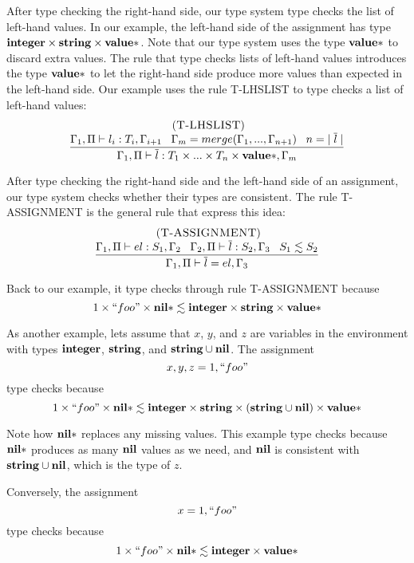 After type checking the right-hand side, our type system type checks the list
of left-hand values.
In our example, the left-hand side of the assignment has type 
$\mathbf{integer} \times \mathbf{string} \times \mathbf{value}{*}$.
Note that our type system uses the type $\mathbf{value}{*}$ to discard extra values.
The rule that type checks lists of left-hand values introduces the type
$\mathbf{value}{*}$ to let the right-hand side produce more values than
expected in the left-hand side.
Our example uses the rule \textsc{T-LHSLIST} to type
checks a list of left-hand values:
\[
\begin{array}{c}
\; (\textsc{T-LHSLIST})\\
\dfrac{\Gamma_{1}, \Pi \vdash l_{i}:T_{i}, \Gamma_{i+1} \;\;\;
       \Gamma_{m} = merge(\Gamma_{1}, ..., \Gamma_{n+1}) \;\;\;
       n = |\;\overline{l}\;|}
      {\Gamma_{1}, \Pi \vdash \overline{l}:T_{1} \times ... \times T_{n} \times \mathbf{value}{*}, \Gamma_{m}}
\end{array}
\]

After type checking the right-hand side and the left-hand side of an assignment,
our type system checks whether their types are consistent.
The rule \textsc{T-ASSIGNMENT} is the general rule that express this idea:
\[
\begin{array}{c}
\; (\textsc{T-ASSIGNMENT})\\
\dfrac{\Gamma_{1}, \Pi \vdash el:S_{1}, \Gamma_{2} \;\;\;
       \Gamma_{2}, \Pi \vdash \overline{l}:S_{2}, \Gamma_{3} \;\;\;
       S_{1} \lesssim S_{2}}
      {\Gamma_{1}, \Pi \vdash \overline{l} = el,\Gamma_{3}}
\end{array}
\]

Back to our example, it type checks through rule \textsc{T-ASSIGNMENT} because
\[
1 \times ``foo" \times \mathbf{nil}{*} \lesssim \mathbf{integer} \times \mathbf{string} \times \mathbf{value}{*}
\]

As another example, lets assume that $x$, $y$, and $z$ are variables in
the environment with types $\mathbf{integer}$, $\mathbf{string}$, and $\mathbf{string} \cup \mathbf{nil}$.
The assignment
\[
x, y, z = 1, ``foo"
\]
type checks because
\[
1 \times ``foo" \times \mathbf{nil}{*} \lesssim \mathbf{integer} \times \mathbf{string} \times (\mathbf{string} \cup \mathbf{nil}) \times \mathbf{value}{*}
\]

Note how $\mathbf{nil}{*}$ replaces any missing values.
This example type checks because $\mathbf{nil}{*}$ produces as many $\mathbf{nil}$
values as we need, and $\mathbf{nil}$ is consistent with $\mathbf{string} \cup \mathbf{nil}$,
which is the type of $z$.

Conversely, the assignment
\[
x = 1, ``foo"
\]
type checks because
\[
1 \times ``foo" \times \mathbf{nil}{*} \lesssim \mathbf{integer} \times \mathbf{value}{*}
\]

